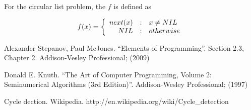 \documentclass{article}
\begin{document}
For the circular list problem, the $f$ is defined as

\begin{equation}
f(x) = \left \{
  \begin{array}
  {r@{\quad:\quad}l}
  next(x) & x \neq NIL \\
  NIL & otherwise
  \end{array}
\right.
\end{equation}

\begin{thebibliography}{99}

Alexander Stepanov, Paul McJones. ``Elements of Programming''. Section 2.3, Chapter 2. Addison-Vesley Professional; (2009)

Donald E. Knuth. ``The Art of Computer Programming, Volume 2: Seminumerical Algorithms (3rd Edition)''. Addison-Wesley Professional; (1997)

Cycle dection. Wikipedia. http://en.wikipedia.org/wiki/Cycle\_detection

\end{thebibliography}

\end{document}
